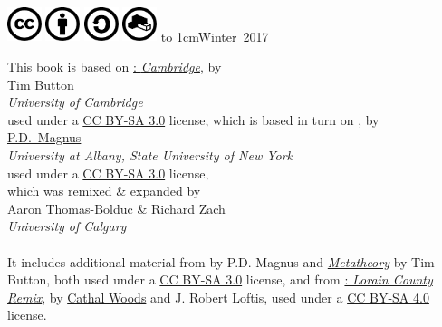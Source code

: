 \thispagestyle{empty}  \pagecolor{darkred}\color{white}


\


\bigskip\bigskip
{}

\vfill
{}
\vfill

\noindent
\includegraphics[width=1cm]{assets/cc.pdf}
\includegraphics[width=1cm]{assets/by}
\includegraphics[width=1cm]{assets/sa}
\includegraphics[width=1cm]{assets/remix}
\hfill \vbox to 1cm{\vfill\hbox{\LARGE Winter 2017}\vfill}

\newpage\nopagecolor\color{black}
\noindent This book is based on \href{http://people.ds.cam.ac.uk/tecb2/forallx.shtml}{\forallx:\emph{ Cambridge}}, by\\[2ex]
\href{http://people.ds.cam.ac.uk/tecb2/index.shtml}{Tim Button}\\
\emph{University of Cambridge}\\[2ex]
used under a \href{https://creativecommons.org/licenses/by-sa/3.0/}{CC BY-SA 3.0} license, which is based in turn on \href{https://www.fecundity.com/logic/}{\forallx}, by\\[2ex]
\href{https://www.fecundity.com/job/}{P.D.\ Magnus}\\
\emph{University at Albany, State University of New York}\\[2ex]
used under a \href{https://creativecommons.org/licenses/by-sa/3.0/}{CC BY-SA 3.0} license,
\\
which was remixed \& expanded by\\[2ex] {Aaron Thomas-Bolduc \& Richard Zach}\\
\emph{University of Calgary}
\\
\\
It includes additional material from \forallx{} by P.D. Magnus
and \href{http://people.ds.cam.ac.uk/tecb2/metatheory.shtml}{\emph{Metatheory}} by Tim Button, both used under
a \href{https://creativecommons.org/licenses/by-sa/3.0/}{CC BY-SA 3.0}
license, and from \href{https://github.com/rob-helpy-chalk/openintroduction}{\forallx: \emph{Lorain County Remix}}, by \href{https://sites.google.com/site/cathalwoods/}{Cathal
Woods} and J. Robert Loftis, used under
a \href{https://creativecommons.org/licenses/by-sa/4.0/}{CC BY-SA 4.0}
license.

